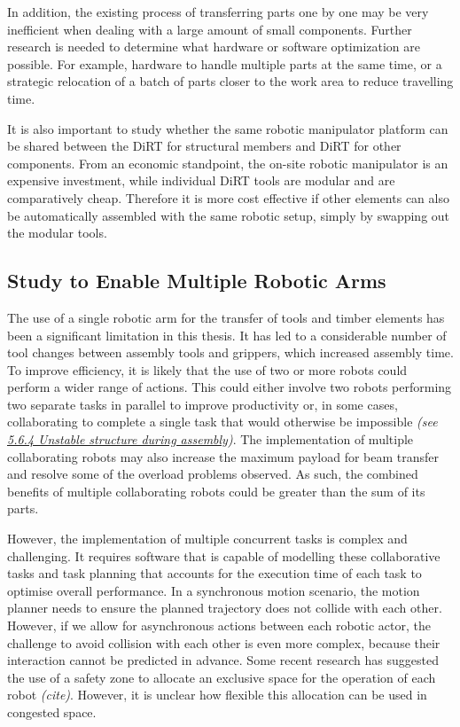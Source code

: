 In addition, the existing process of transferring parts one by one may be very inefficient when dealing with a large amount of small components. Further research is needed to determine what hardware or software optimization are possible. For example, hardware to handle multiple parts at the same time, or a strategic relocation of a batch of parts closer to the work area to reduce travelling time. 

It is also important to study whether the same robotic manipulator platform can be shared between the DiRT for structural members and DiRT for other components. From an economic standpoint, the on-site robotic manipulator is an expensive investment, while individual DiRT tools are modular and are comparatively cheap. Therefore it is more cost effective if other elements can also be automatically assembled with the same robotic setup, simply by swapping out the modular tools.

\subsection{Study to Enable Multiple Robotic Arms}
\label{subsection:study_to_enable_multiple_robots
}
The use of a single robotic arm for the transfer of tools and timber elements has been a significant limitation in this thesis. It has led to a considerable number of tool changes between assembly tools and grippers, which increased assembly time. To improve efficiency, it is likely that the use of two or more robots could perform a wider range of actions. This could either involve two robots performing two separate tasks in parallel to improve productivity or, in some cases, collaborating to complete a single task that would otherwise be impossible \textit{(see \ul{5.6.4 Unstable structure during assembly})}. The implementation of multiple collaborating robots may also increase the maximum payload for beam transfer and resolve some of the overload problems observed. As such, the combined benefits of multiple collaborating robots could be greater than the sum of its parts.

However, the implementation of multiple concurrent tasks is complex and challenging. It requires software that is capable of modelling these collaborative tasks and task planning that accounts for the execution time of each task to optimise overall performance. In a synchronous motion scenario, the motion planner needs to ensure the planned trajectory does not collide with each other. However, if we allow for asynchronous actions between each robotic actor, the challenge to avoid collision with each other is even more complex, because their interaction cannot be predicted in advance. Some recent research has suggested the use of a safety zone to allocate an exclusive space for the operation of each robot \textit{(cite)}. However, it is unclear how flexible this allocation can be used in congested space.

